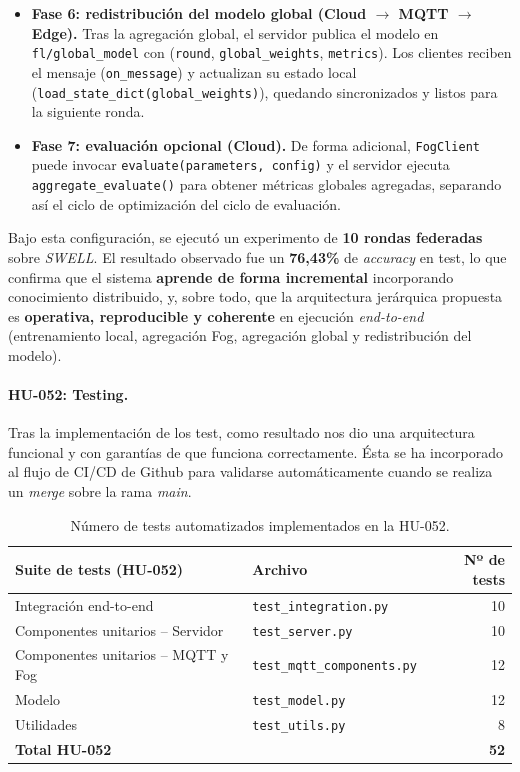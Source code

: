 \documentclass{report}
\begin{document}
\begin{itemize}
    \item \textbf{Fase 6: redistribución del modelo global (Cloud $\rightarrow$ MQTT $\rightarrow$ Edge).} Tras la agregación global, el servidor publica el modelo en \texttt{fl/global\_model} con (\texttt{round}, \texttt{global\_weights}, \texttt{metrics}). Los clientes reciben el mensaje (\texttt{on\_message}) y actualizan su estado local (\texttt{load\_state\_dict(global\_weights)}), quedando sincronizados y listos para la siguiente ronda.

    \item \textbf{Fase 7: evaluación opcional (Cloud).} De forma adicional, \texttt{FogClient} puede invocar \texttt{evaluate(parameters, config)} y el servidor ejecuta \texttt{aggregate\_evaluate()} para obtener métricas globales agregadas, separando así el ciclo de optimización del ciclo de evaluación.
\end{itemize}

Bajo esta configuración, se ejecutó un experimento de \textbf{10 rondas federadas} sobre \textit{SWELL}. El resultado observado fue un \textbf{76{,}43\%} de \emph{accuracy} en test, lo que confirma que el sistema \textbf{aprende de forma incremental} incorporando conocimiento distribuido, y, sobre todo, que la arquitectura jerárquica propuesta es \textbf{operativa, reproducible y coherente} en ejecución \emph{end-to-end} (entrenamiento local, agregación Fog, agregación global y redistribución del modelo).



\vspace{0.15em}
\paragraph{HU-052: Testing.}
Tras la implementación de los test, como resultado nos dio una arquitectura funcional y con garantías de que funciona correctamente. Ésta se ha incorporado al flujo de CI/CD de Github para validarse automáticamente cuando se realiza un \textit{merge} sobre la rama \textit{main}.
\begin{table}[H]
\centering
\caption{Número de tests automatizados implementados en la HU-052.}
\label{tab:tests-hu052}
\renewcommand{\arraystretch}{1.2}
\setlength{\tabcolsep}{6pt}

\begin{tabular}{|l|l|r|}
\hline
\textbf{Suite de tests (HU-052)} & \textbf{Archivo} & \textbf{Nº de tests} \\
\hline
Integración end-to-end & \texttt{test\_integration.py} & 10 \\
Componentes unitarios -- Servidor & \texttt{test\_server.py} & 10 \\
Componentes unitarios -- MQTT y Fog & \texttt{test\_mqtt\_components.py} & 12 \\
Modelo & \texttt{test\_model.py} & 12 \\
Utilidades & \texttt{test\_utils.py} & 8 \\
\hline
\textbf{Total HU-052} & & \textbf{52} \\
\hline
\end{tabular}
\end{table}
\end{document}

